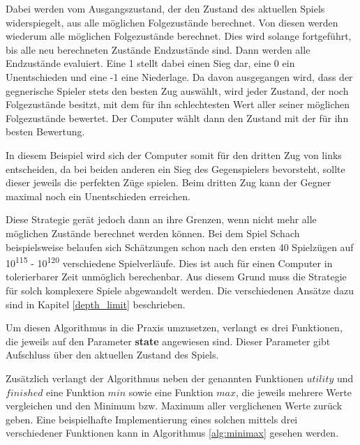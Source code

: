 Dabei werden vom Ausgangszustand, der den Zustand des aktuellen Spiels widerspiegelt, aus alle möglichen Folgezustände berechnet. Von diesen werden wiederum alle möglichen Folgezustände berechnet. Dies wird solange fortgeführt, bis alle neu berechneten Zustände Endzustände sind. Dann werden alle Endzustände evaluiert. Eine 1 stellt dabei einen Sieg dar, eine 0 ein Unentschieden und eine -1 eine Niederlage. Da davon ausgegangen wird, dass der gegnerische Spieler stets den besten Zug auswählt, wird jeder Zustand, der noch Folgezustände besitzt, mit dem für ihn schlechtesten Wert aller seiner möglichen Folgezustände bewertet. Der Computer wählt dann den Zustand mit der für ihn besten Bewertung. \cite{Russell2010}

In diesem Beispiel wird sich der Computer somit für den dritten Zug von links entscheiden, da bei beiden anderen ein Sieg des Gegenspielers bevorsteht, sollte dieser jeweils die perfekten Züge spielen. Beim dritten Zug kann der Gegner maximal noch ein Unentschieden erreichen.

Diese Strategie gerät jedoch dann an ihre Grenzen, wenn nicht mehr alle möglichen Zustände berechnet werden können. Bei dem Spiel Schach beispielsweise belaufen sich Schätzungen schon nach den ersten 40 Spielzügen auf 10\textsuperscript{115} - 10\textsuperscript{120} verschiedene Spielverläufe. \cite{Bonsdorff1978} Dies ist auch für einen Computer in tolerierbarer Zeit unmöglich berechenbar. Aus diesem Grund muss die Strategie für solch komplexere Spiele abgewandelt werden. Die verschiedenen Ansätze dazu sind in Kapitel \ref{depth_limit} beschrieben.


Um diesen Algorithmus in die Praxis umzusetzen, verlangt es drei Funktionen, die jeweils auf den Parameter \textbf{state} angewiesen sind. Dieser Parameter gibt Aufschluss über den aktuellen Zustand des Spiels.

Zusätzlich verlangt der Algorithmus neben der genannten Funktionen $utility$ und $finished$ eine Funktion $min$ sowie eine Funktion $max$, die jeweils mehrere Werte vergleichen und den Minimum bzw. Maximum aller verglichenen Werte zurück geben. Eine beispielhafte Implementierung eines solchen mittels drei verschiedener Funktionen kann in Algorithmus \ref{alg:minimax} gesehen werden.

